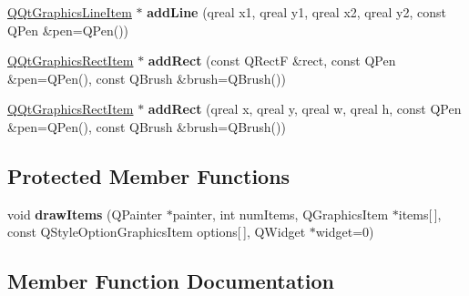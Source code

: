 \begin{DoxyCompactItemize}
\item 
\mbox{\label{class_q_qt_graphics_scene_a5d7b4d57f1b4c1437f686039962fc720}} 
\mbox{\hyperlink{class_q_qt_graphics_line_item}{Q\+Qt\+Graphics\+Line\+Item}} $\ast$ {\bfseries add\+Line} (qreal x1, qreal y1, qreal x2, qreal y2, const Q\+Pen \&pen=Q\+Pen())
\item 
\mbox{\label{class_q_qt_graphics_scene_a5265501a7d19c1867b62e981b5e74080}} 
\mbox{\hyperlink{class_q_qt_graphics_rect_item}{Q\+Qt\+Graphics\+Rect\+Item}} $\ast$ {\bfseries add\+Rect} (const Q\+RectF \&rect, const Q\+Pen \&pen=Q\+Pen(), const Q\+Brush \&brush=Q\+Brush())
\item 
\mbox{\label{class_q_qt_graphics_scene_aeb8aa189a1840cbc4d5b0b60b066aa8f}} 
\mbox{\hyperlink{class_q_qt_graphics_rect_item}{Q\+Qt\+Graphics\+Rect\+Item}} $\ast$ {\bfseries add\+Rect} (qreal x, qreal y, qreal w, qreal h, const Q\+Pen \&pen=Q\+Pen(), const Q\+Brush \&brush=Q\+Brush())
\end{DoxyCompactItemize}
\subsection*{Protected Member Functions}
\begin{DoxyCompactItemize}
\item 
\mbox{\label{class_q_qt_graphics_scene_a45d2b01a24d559284034cca2d47877a1}} 
void {\bfseries draw\+Items} (Q\+Painter $\ast$painter, int num\+Items, Q\+Graphics\+Item $\ast$items\mbox{[}$\,$\mbox{]}, const Q\+Style\+Option\+Graphics\+Item options\mbox{[}$\,$\mbox{]}, Q\+Widget $\ast$widget=0)
\end{DoxyCompactItemize}


\subsection{Member Function Documentation}
\mbox{\label{class_q_qt_graphics_scene_a1744444e22949f5207050aaba010a0be}} 

